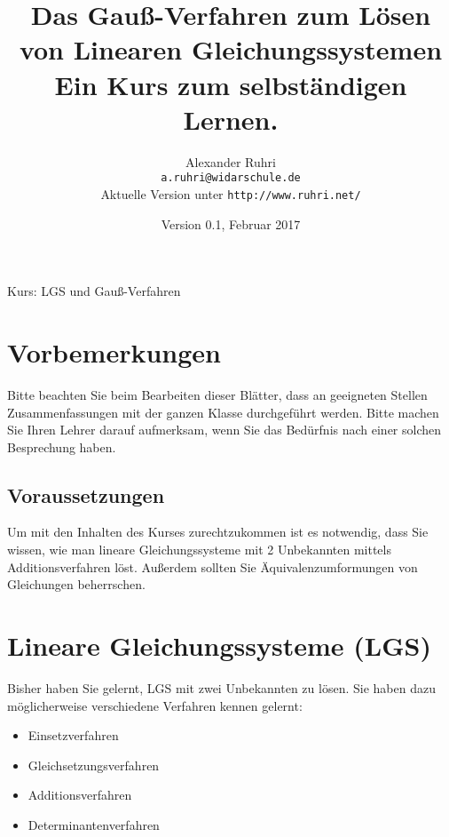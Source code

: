 \documentclass[12pt,a4paper,twoside,fleqn]{article}
\begin{document}
\renewcommand{\thepage}{Seite~\arabic{page}}
\renewcommand{\baselinestretch}{1.2}

\renewcommand{\labelenumi}{{\bf\arabic{enumi}.)}}
\renewcommand{\labelenumii}{{\bf\alph{enumii})}}
\renewcommand{\labelenumiii}{{\bf\roman{enumiii})}}

\renewcommand{\thecolumn}{{\bf\alph{column}\ }}
\newcommand{\labelcolumn}{{\bf\alph{column})\ \ \ }}
\setlength{\itemsep}{0pt}
\setlength{\mathindent}{0cm}



\pagestyle{myheadings}
%
{Kurs: LGS und Gauß-Verfahren\hfill}
\title{Das Gauß-Verfahren zum Lösen von Linearen Gleichungssystemen\\\large{Ein Kurs
  zum selbständigen Lernen.}}
\author{Alexander Ruhri\\
  \small\texttt{a.ruhri@widarschule.de}\\
  \small Aktuelle Version unter \texttt{http://www.ruhri.net/}}
\date{\small Version 0.1, Februar 2017}
\maketitle
\section*{Vorbemerkungen}
Bitte beachten Sie beim Bearbeiten dieser Blätter, dass an geeigneten
Stellen Zusammenfassungen mit der ganzen Klasse durchgeführt
werden. Bitte machen Sie Ihren Lehrer darauf aufmerksam, wenn Sie das
Bedürfnis nach einer solchen Besprechung haben. 
\subsection*{Voraussetzungen}
Um mit den Inhalten des Kurses zurechtzukommen ist es notwendig,
dass Sie wissen, wie man lineare Gleichungssysteme mit 2 Unbekannten
mittels Additionsverfahren löst. Außerdem sollten Sie
Äquivalenzumformungen von Gleichungen beherrschen.
\tableofcontents
\newpage
\section{Lineare Gleichungssysteme (LGS)}
Bisher haben Sie gelernt, LGS mit zwei Unbekannten zu lösen. Sie haben
dazu möglicherweise verschiedene Verfahren kennen gelernt:
\begin{itemize}
\item Einsetzverfahren
\item Gleichsetzungsverfahren
\item Additionsverfahren
\item Determinantenverfahren
\end{itemize}
\end{document}
